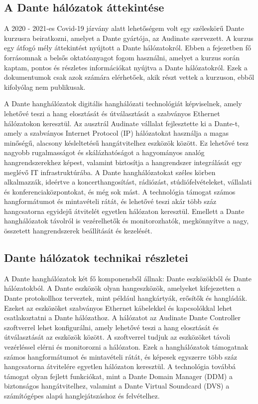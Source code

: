 \subsection{A Dante hálózatok áttekintése}
A 2020 - 2021-es Covid-19 járvány alatt lehetőségem volt egy széleskörű Dante
kurzusra beiratkozni, amelyet a Dante gyártója, az Audinate szervezett. A kurzus
egy átfogó mély áttekintést nyújtott a Dante hálózatokról. Ebben a fejezetben
fő forrásomnak a belsős oktatóanyagot fogom használni, amelyet a kurzus
során kaptam, pontos és részletes információkat nyújtva a Dante hálózatokról.
Ezek a dokumentumok csak azok számára elérhetőek, akik részt vettek a kurzuson, ebből kifolyólag nem publikusak.

A Dante hanghálózatok digitális hanghálózati technológiát képviselnek, amely
lehetővé teszi a hang elosztását és útválasztását a szabványos Ethernet
hálózatokon keresztül. Az ausztrál Audinate vállalat fejlesztette ki a Dante-t,
amely a szabványos Internet Protocol (IP) hálózatokat használja a magas minőségű,
alacsony késleltetésű hangátvitelhez eszközök között. Ez lehetővé tesz
nagyobb rugalmasságot és skálázhatóságot a hagyományos analóg hangrendszerekhez
képest, valamint biztosítja a hangrendszer integrálását egy meglévő IT infrastruktúrába.
A Dante hanghálózatokat széles körben alkalmazzák, ideértve a koncerthangosítást,
rádiózást, stúdiófelvételeket, vállalati és konferenciaközpontokat, és még sok mást.
A technológia támogat számos hangformátumot és mintavételi rátát, és lehetővé
teszi akár több száz hangcsatorna egyidejű átvitelét egyetlen hálózaton keresztül.
Emellett a Dante hanghálózatok távolról is vezérelhetők és monitorozhatók,
megkönnyítve a nagy, összetett hangrendszerek beállítását és kezelését.

\subsection{Dante hálózatok technikai részletei}
A Dante hanghálózatok két fő komponensből állnak: Dante eszközökből
és Dante hálózatokból. A Dante eszközök olyan hangeszközök, amelyeket
kifejezetten a Dante protokollhoz terveztek, mint például hangkártyák, erősítők
és hangládák. Ezeket az eszközöket szabványos Ethernet kábelekkel és
kapcsolókkal lehet csatlakoztatni a Dante hálózathoz.
A hálózatot az Audinate Dante Controller szoftverrel lehet
konfigurálni, amely lehetővé teszi a hang elosztását és útválasztását az
eszközök között. A szoftverrel tudjuk az eszközöket távoli vezérléssel elérni és
monitorozni a hálózaton. Ezek a hanghálózatok támogatnak számos
hangformátumot és mintavételi rátát, és képesek egyszerre több száz hangcsatorna
átvitelére egyetlen hálózaton keresztül. A technológia továbbá támogat olyan
fejlett funkciókat, mint a Dante Domain Manager (DDM) a biztonságos
hangátvitelhez, valamint a Dante Virtual Soundcard (DVS) a számítógépes alapú
hanglejátszáshoz és felvételhez. 

